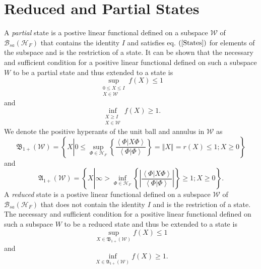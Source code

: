 \documentclass[aps,preprint]{revtex4}%
\begin{document}
\section{Reduced and Partial States}

A \emph{partial} state is a postive linear functional defined on a subspace
$\mathcal{W}$ of $\mathcal{B}_{sa}\left(  \mathcal{H}_{F}\right)  $ that
contains the identity $I$ and satisfies eq. $\left(  \ref{States}\right)  $
for elements of the subspace and is the restriction of a state. It can be
shown \cite{Emch} that the necessary and sufficient condition for a positive
linear functional defined on such a subspace $W$ to be a partial state and
thus extended to a state is
\begin{equation}
\sup_{\substack{0\leq X\leq I\\X\in\mathcal{W}}}f\left(  X\right)  \leq1
\label{LessI}%
\end{equation}
and%
\begin{equation}
\inf_{\substack{X\geq I\\X\in\mathcal{W}}}f\left(  X\right)  \geq1.
\label{MoreI}%
\end{equation}
We denote the positive hyperants of the unit ball and annulus in $\mathcal{W}$
as
\begin{equation}
\mathfrak{B}_{1+}\left(  \mathcal{W}\right)  =\left\{  X\left\vert 0\leq
\sup_{\Phi\in\mathcal{H}_{F}}\left\{  \frac{\left\langle \left.
\Phi\right\vert X\Phi\right\rangle }{\left\langle \left.  \Phi\right\vert
\Phi\right\rangle }\right\}  =\left\Vert X\right\Vert =r\left(  X\right)
\leq1;X\geq0\right.  \right\}
\end{equation}
and
\begin{equation}
\mathfrak{A}_{1+}\left(  \mathcal{W}\right)  =\left\{  X\left\vert \infty
>\inf_{\Phi\in\mathcal{H}_{F}}\left\{  \left\vert \frac{\left\langle \left.
\Phi\right\vert X\Phi\right\rangle }{\left\langle \left.  \Phi\right\vert
\Phi\right\rangle }\right\vert \right\}  \geq1;X\geq0\right.  \right\}  .
\end{equation}
A \emph{reduced} state is a postive linear functional defined on a subspace
$\mathcal{W}$ of $\mathcal{B}_{sa}\left(  \mathcal{H}_{F}\right)  $ that does
not contain the identity $I$ and is the restriction of a state. The necessary
and sufficient condition for a positive linear functional defined on such a
subspace $W$ to be a reduced state and thus be extended to a state is
\begin{equation}
\sup_{X\in\mathfrak{B}_{1+}\left(  \mathcal{W}\right)  }f\left(  X\right)
\leq1
\end{equation}
and%
\begin{equation}
\inf_{X\in\mathfrak{A}_{1+}\left(  \mathcal{W}\right)  }f\left(  X\right)
\geq1.
\end{equation}
\end{document}
